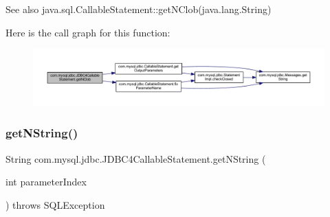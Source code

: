 \begin{DoxySeeAlso}{See also}
java.\+sql.\+Callable\+Statement\+::get\+N\+Clob(java.\+lang.\+String) 
\end{DoxySeeAlso}
Here is the call graph for this function\+:
\nopagebreak
\begin{figure}[H]
\begin{center}
\leavevmode
\includegraphics[width=350pt]{classcom_1_1mysql_1_1jdbc_1_1_j_d_b_c4_callable_statement_aefb73c39ced84e5e0e96825272f0017f_cgraph}
\end{center}
\end{figure}
\mbox{\label{classcom_1_1mysql_1_1jdbc_1_1_j_d_b_c4_callable_statement_a76edc16d913bef376e7262364251feb4}} 
\subsubsection{\texorpdfstring{get\+N\+String()}{getNString()}\hspace{0.1cm}{\footnotesize\ttfamily [1/2]}}
{\footnotesize\ttfamily String com.\+mysql.\+jdbc.\+J\+D\+B\+C4\+Callable\+Statement.\+get\+N\+String (\begin{DoxyParamCaption}\item[{int}]{parameter\+Index }\end{DoxyParamCaption}) throws S\+Q\+L\+Exception}

